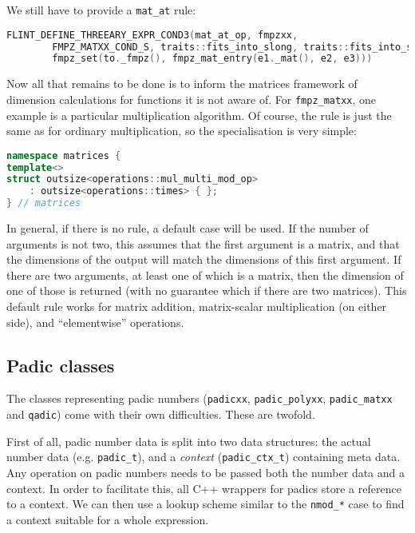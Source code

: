\documentclass[a4paper,10pt]{book}
\newcommand{\code}{\lstinline}
\begin{document}
{{We still have to provide a \code{mat_at} rule:

\begin{lstlisting}[language=c++]
FLINT_DEFINE_THREEARY_EXPR_COND3(mat_at_op, fmpzxx,
        FMPZ_MATXX_COND_S, traits::fits_into_slong, traits::fits_into_slong,
        fmpz_set(to._fmpz(), fmpz_mat_entry(e1._mat(), e2, e3)))
\end{lstlisting}

Now all that remains to be done is to inform the matrices framework of dimension
calculations for functions it is not aware of. For \code{fmpz_matxx}, one
example is a particular multiplication algorithm. Of course, the rule is just
the same as for ordinary multiplication, so the specialisation is very simple:

\begin{lstlisting}[language=c++]
namespace matrices {
template<>
struct outsize<operations::mul_multi_mod_op>
    : outsize<operations::times> { };
} // matrices
\end{lstlisting}

In general, if there is no rule, a default case will be used. If the number of
arguments is not two, this assumes that the first argument is a matrix, and that
the dimensions of the output will match the dimensions of this first argument.
If there are two arguments, at least one of which is a matrix, then the
dimension of one of those is returned (with no guarantee which if there are two
matrices). This default rule works for matrix addition, matrix-scalar
multiplication (on either side), and ``elementwise'' operations.

\subsection{Padic classes}

The classes representing padic numbers (\code{padicxx}, \code{padic_polyxx},
\code{padic_matxx} and \code{qadic}) come with their own difficulties. These are
twofold.

First of all, padic number data is split into two data structures: the actual
number data (e.g. \code{padic_t}), and a \emph{context} (\code{padic_ctx_t})
containing meta data.
Any operation on padic numbers needs to be passed both the number data and a
context. In order to facilitate this, all C++ wrappers for padics store a
reference to a context. We can then use a lookup scheme similar to the
\code{nmod_*} case to find a context suitable for a whole expression.

}}
\end{document}
